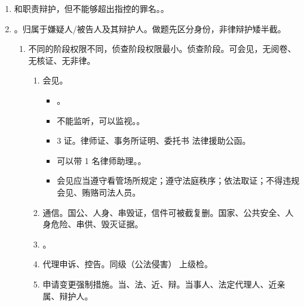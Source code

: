 \begin{enumerate}
\begin{enumerate}
\begin{enumerate}
                  \item 相对禁止。公检法安监，现、陪、利、外、开公、吊执照。
                        公检法安监现职人员，陪审员，利害关系，外国人、被开除公职或吊销律师执照。
                        。
                  \item 法检限制。2 年、终身、家庭店。离任后 2 年内，不得以律师身份担任诉讼代理人或辩护人。
                  \item \sjt 例外。为近亲属或监护人辩护。
                \end{enumerate}
          \item {}和职责辩护，但不能够超出指控的罪名。。
          \item {}。归属于嫌疑人/被告人及其辩护人。做题先区分身份，非律辩护矮半截。
                \begin{enumerate}
                  \item 不同的阶段权限不同，侦查阶段权限最小。侦查阶段。可会见，无阅卷、无核证、无非律。
                        \begin{enumerate}
                          \item 会见。
                                \begin{itemize}
                                  \item {}。
                                  \item 不能监听，可以监视。。
                                  \item 3 证。律师证、事务所证明、委托书 \hz 法律援助公函。
                                  \item 可以带 1 名律师助理。。
                                  \item 会见应当遵守看管场所规定；遵守法庭秩序；依法取证；不得违规会见、贿赂司法人员。
                                \end{itemize}
                          \item 通信。国公、人身、串毁证，信件可被截复删。国家、公共安全、人身危险、串供、毁灭证据。
                          \item {}。
                          \item 代理申诉、控告。同级（公法侵害） \hz 上级检。
                          \item 申请变更强制措施。当、法、近、辩。当事人、法定代理人、近亲属、辩护人。

\end{enumerate}
\end{enumerate}
\end{enumerate}
\end{enumerate}
